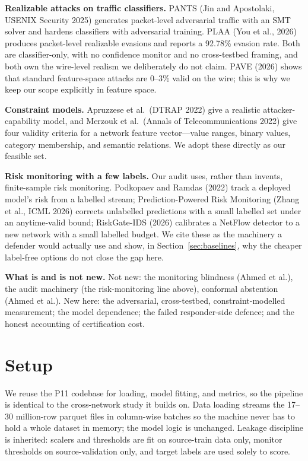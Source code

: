 \documentclass[11pt]{article}
\begin{document}
\textbf{Realizable attacks on traffic classifiers.} PANTS (Jin and Apostolaki, USENIX Security 2025) generates packet-level adversarial traffic with an SMT solver and hardens classifiers with adversarial training. PLAA (You et al., 2026) produces packet-level realizable evasions and reports a 92.78\% evasion rate. Both are classifier-only, with no confidence monitor and no cross-testbed framing, and both own the wire-level realism we deliberately do not claim. PAVE (2026) shows that standard feature-space attacks are 0--3\% valid on the wire; this is why we keep our scope explicitly in feature space.

\textbf{Constraint models.} Apruzzese et al.\ (DTRAP 2022) give a realistic attacker-capability model, and Merzouk et al.\ (Annals of Telecommunications 2022) give four validity criteria for a network feature vector---value ranges, binary values, category membership, and semantic relations. We adopt these directly as our feasible set.

\textbf{Risk monitoring with a few labels.} Our audit uses, rather than invents, finite-sample risk monitoring. Podkopaev and Ramdas (2022) track a deployed model's risk from a labelled stream; Prediction-Powered Risk Monitoring (Zhang et al., ICML 2026) corrects unlabelled predictions with a small labelled set under an anytime-valid bound; RiskGate-IDS (2026) calibrates a NetFlow detector to a new network with a small labelled budget. We cite these as the machinery a defender would actually use and show, in Section~\ref{sec:baselines}, why the cheaper label-free options do not close the gap here.

\textbf{What is and is not new.} Not new: the monitoring blindness (Ahmed et al.), the audit machinery (the risk-monitoring line above), conformal abstention (Ahmed et al.). New here: the adversarial, cross-testbed, constraint-modelled measurement; the model dependence; the failed responder-side defence; and the honest accounting of certification cost.

\section{Setup}
We reuse the P11 codebase for loading, model fitting, and metrics, so the pipeline is identical to the cross-network study it builds on. Data loading streams the 17--30 million-row parquet files in column-wise batches so the machine never has to hold a whole dataset in memory; the model logic is unchanged. Leakage discipline is inherited: scalers and thresholds are fit on source-train data only, monitor thresholds on source-validation only, and target labels are used solely to score.
\end{document}
